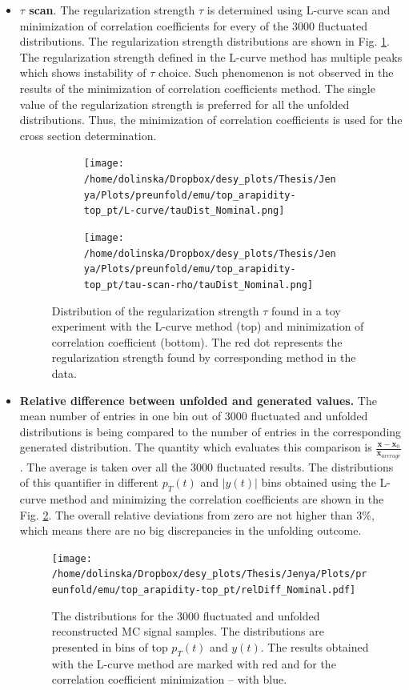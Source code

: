 \begin{itemize}

 \item \textbf{$\tau$ scan}. The regularization strength $\tau$ is determined using L-curve scan and minimization of correlation coefficients for every
 of the 3000 fluctuated distributions. The regularization strength distributions are shown in
 Fig. \ref{fig:tau_scan}. The regularization strength defined in the L-curve method has multiple peaks which shows instability of $\tau$ choice.
 Such phenomenon is not observed in the results of the minimization of correlation coefficients method. The single value of the regularization strength
 is preferred for all the unfolded distributions. Thus, the minimization of correlation coefficients is used for the cross section determination.
 \begin{figure}[p]
 \centering
 \begin{subfigure}
  \centering
  \texttt{[image: /home/dolinska/Dropbox/desy\_plots/Thesis/Jenya/Plots/preunfold/emu/top\_arapidity-top\_pt/L-curve/tauDist\_Nominal.png]}
 \end{subfigure}
 \begin{subfigure}
  \centering
  \texttt{[image: /home/dolinska/Dropbox/desy\_plots/Thesis/Jenya/Plots/preunfold/emu/top\_arapidity-top\_pt/tau-scan-rho/tauDist\_Nominal.png]}
 \end{subfigure}
 \caption{Distribution of the regularization strength $\tau$ found in a toy experiment with the L-curve method (top) and minimization of correlation coefficient
         (bottom). The red dot represents the regularization strength found by corresponding method in the data.}
 \label{fig:tau_scan}
 \end{figure}
 
 \item \textbf{Relative difference between unfolded and generated values.} The mean number of entries in one bin out of 3000 fluctuated and unfolded distributions
 is being compared to the number of entries in the corresponding generated distribution. The quantity which evaluates this comparison is
 $\frac{\mathbf{x} - \mathbf{x}_{0}}{\mathbf{x}_{average}}$. The average is taken over all the 3000 fluctuated results.
 The distributions of this quantifier in different $p_{T}(t)$ and $|y(t)|$ bins obtained using the L-curve method and minimizing the correlation coefficients 
 are shown in the Fig. \ref{fig:DiffovErr}. The overall relative deviations from zero are not
 higher than 3\%, which means there are no big discrepancies in the unfolding outcome.
 \begin{figure}[h]
 \centering
 \texttt{[image: /home/dolinska/Dropbox/desy\_plots/Thesis/Jenya/Plots/preunfold/emu/top\_arapidity-top\_pt/relDiff\_Nominal.pdf]}
 \caption{The distributions for the 3000 fluctuated and unfolded reconstructed MC signal samples. The distributions are
         presented in bins of top $p_{T}(t)$ and $y(t)$. The results obtained with the L-curve method are marked with red and 
         for the correlation coefficient minimization -- with blue.}
 \label{fig:DiffovErr}
\end{figure}
 

\end{itemize}
